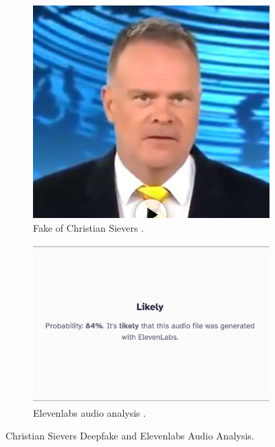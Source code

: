 \documentclass[
  a4paper,  %
  twoside,  %
  bibliography=totoc,
  headsepline,
  cleardoublepage=empty,
  parskip=half,
  draft=false
]{scrbook}
\begin{document}
\begin{figure}[h]
  \centering
  \begin{subfigure}[b]{0.45\textwidth}
    \includegraphics[width=\textwidth]{./graphics/sievers.png}
    \caption{Fake of Christian Sievers \cite{zdfDeepfakeMitZDFModerator}.}
    \label{fig:sievers-fake}
  \end{subfigure}
  \hfill
  \begin{subfigure}[b]{0.5\textwidth}
    \includegraphics[width=\textwidth]{./graphics/sievers-11labs.png}
    \caption{Elevenlabs audio analysis \cite{elevenlabsAISpeechClassifier}.}
    \label{fig:sievers-11labs}
  \end{subfigure}
  \caption{Christian Sievers Deepfake and Elevenlabs Audio Analysis.}
\end{figure}
\end{document}
